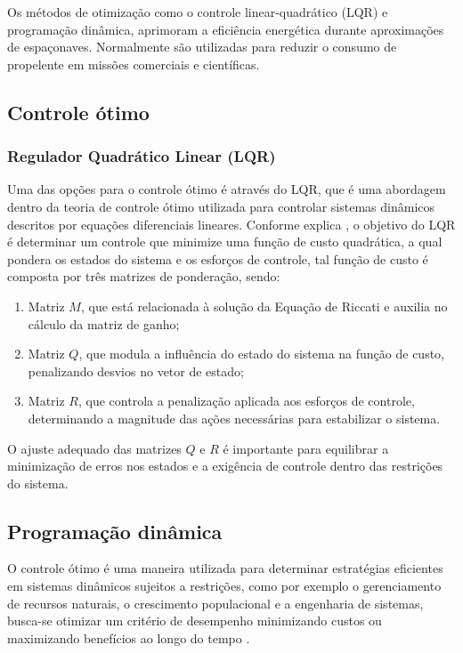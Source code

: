 Os métodos de otimização como o controle linear-quadrático (LQR) e programação dinâmica, aprimoram a eficiência energética durante aproximações de espaçonaves. Normalmente são utilizadas para reduzir o consumo de propelente em missões comerciais e científicas.

\subsection{Controle ótimo}

\subsubsection{Regulador Quadrático Linear (LQR)}

Uma das opções para o controle ótimo é através do LQR, que é uma abordagem dentro da teoria de controle ótimo utilizada para controlar sistemas dinâmicos descritos por equações diferenciais lineares. Conforme explica \citep{clemente2020}, o objetivo do LQR é determinar um controle que minimize uma função de custo quadrática, a qual pondera os estados do sistema e os esforços de controle, tal função de custo é composta por três matrizes de ponderação, sendo:
\begin{enumerate}
    \item Matriz \(M\), que está relacionada à solução da Equação de Riccati e auxilia no cálculo da matriz de ganho;
    \item  Matriz \(Q\), que modula a influência do estado do sistema na função de custo, penalizando desvios no vetor de estado; 
    \item Matriz \(R\), que controla a penalização aplicada aos esforços de controle, determinando a magnitude das ações necessárias para estabilizar o sistema.
\end{enumerate}
O ajuste adequado das matrizes \(Q\) e \(R\) é importante para equilibrar a minimização de erros nos estados e a exigência de controle dentro das restrições do sistema.

\subsection{Programação dinâmica}

O controle ótimo é uma maneira utilizada para determinar estratégias eficientes em sistemas dinâmicos sujeitos a restrições, como por exemplo o gerenciamento de recursos naturais, o crescimento populacional e a engenharia de sistemas, busca-se otimizar um critério de desempenho minimizando custos ou maximizando benefícios ao longo do tempo \citep{dinizBassanezi}. 

